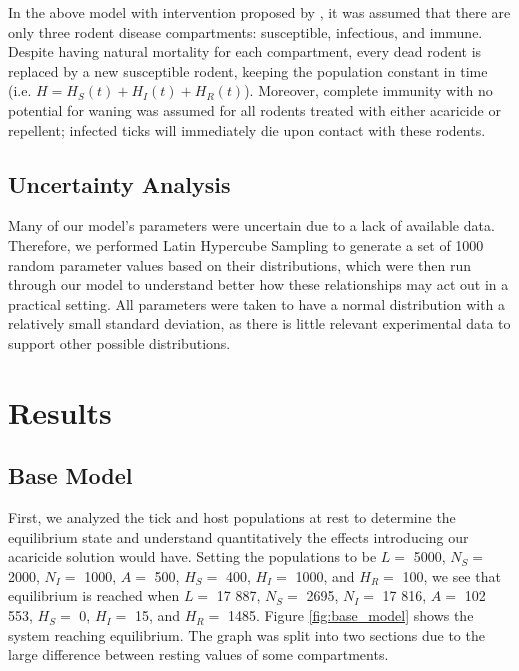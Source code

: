 \documentclass[12pt, centerh1]{article}
\begin{document}
In the above model with intervention proposed by \cite{tosato2021host}, it was assumed that there are only three rodent disease compartments: susceptible, infectious, and immune. Despite having natural mortality for each compartment, every dead rodent is replaced by a new susceptible rodent, keeping the population constant in time (i.e. $H = H_S(t) + H_I(t) + H_R(t)$). Moreover, complete immunity with no potential for waning was assumed for all rodents treated with either acaricide or repellent; infected ticks will immediately die upon contact with these rodents.


\subsection{Uncertainty Analysis}
Many of our model's parameters were uncertain due to a lack of available data. Therefore, we performed Latin Hypercube Sampling to generate a set of 1000 random parameter values based on their distributions, which were then run through our model to understand better how these relationships may act out in a practical setting. All parameters were taken to have a normal distribution with a relatively small standard deviation, as there is little relevant experimental data to support other possible distributions. 


\section{Results}

\subsection{Base Model}
First, we analyzed the tick and host populations at rest to determine the equilibrium state and understand quantitatively the effects introducing our acaricide solution would have. Setting the populations to be $L=$ 5000, $N_S=$ 2000, $N_I=$ 1000, $A=$ 500, $H_S=$ 400, $H_I=$ 1000, and $H_R=$ 100, we see that equilibrium is reached when $L=$ 17 887, $N_S=$ 2695, $N_I=$ 17 816, $A=$ 102 553, $H_S=$ 0, $H_I=$ 15, and $H_R=$ 1485. Figure \ref{fig:base_model} shows the system reaching equilibrium. The graph was split into two sections due to the large difference between resting values of some compartments.
\end{document}

